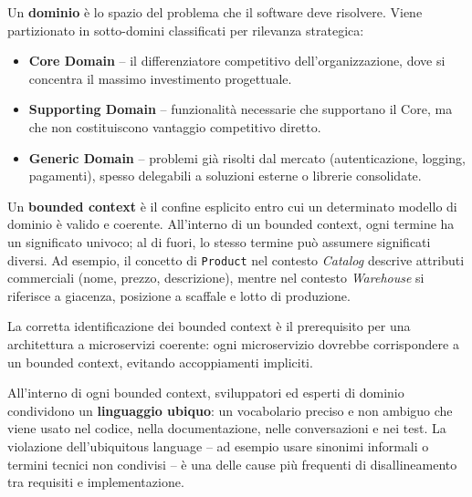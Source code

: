 \documentclass[12pt,a4paper]{report}
\begin{document}
\begin{description}[style=nextline, leftmargin=1.5cm]
  \item[\textsf{Dominio e Sotto-domini}]
    Un \textbf{dominio} è lo spazio del problema che il software deve risolvere.
    Viene partizionato in sotto-domini classificati per rilevanza strategica:
    \begin{itemize}
      \item \textbf{Core Domain} -- il differenziatore competitivo dell'organizzazione,
            dove si concentra il massimo investimento progettuale.
      \item \textbf{Supporting Domain} -- funzionalità necessarie che supportano il
            Core, ma che non costituiscono vantaggio competitivo diretto.
      \item \textbf{Generic Domain} -- problemi già risolti dal mercato
            (autenticazione, logging, pagamenti), spesso delegabili a soluzioni
            esterne o librerie consolidate.
    \end{itemize}

  \item[\textsf{Bounded Context}]
    Un \textbf{bounded context} è il confine esplicito entro cui un determinato
    modello di dominio è valido e coerente. All'interno di un bounded context,
    ogni termine ha un significato univoco; al di fuori, lo stesso termine può
    assumere significati diversi. Ad esempio, il concetto di \texttt{Product} nel
    contesto \textit{Catalog} descrive attributi commerciali (nome, prezzo,
    descrizione), mentre nel contesto \textit{Warehouse} si riferisce a giacenza,
    posizione a scaffale e lotto di produzione.

    La corretta identificazione dei bounded context è il prerequisito per una
    architettura a microservizi coerente: ogni microservizio dovrebbe corrispondere
    a un bounded context, evitando accoppiamenti impliciti.

  \item[\textsf{Ubiquitous Language}]
    All'interno di ogni bounded context, sviluppatori ed esperti di dominio
    condividono un \textbf{linguaggio ubiquo}: un vocabolario preciso e non ambiguo
    che viene usato nel codice, nella documentazione, nelle conversazioni e nei
    test. La violazione dell'ubiquitous language -- ad esempio usare sinonimi
    informali o termini tecnici non condivisi -- è una delle cause più frequenti
    di disallineamento tra requisiti e implementazione.


\end{description}
\end{document}
